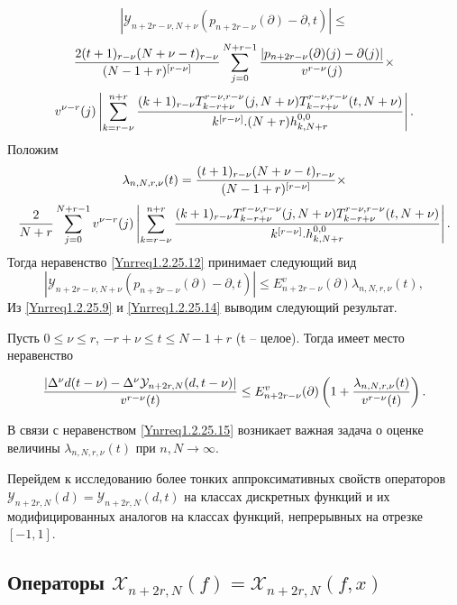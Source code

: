 $$
|\mathcal{Y}_{n+2r-\nu,N+\nu}(p_{n+2r-\nu}(\partial)-\partial,t)|\le
$$
$$
{2(t+1)_{r-\nu}(N+\nu-t)_{r-\nu}\over (N-1+r)^{[r-\nu]}}\sum_{j=0}^{N+r-1}{|p_{n+2r-\nu}(\partial)(j)-\partial(j)|\over v^{r-\nu}(j)}\times
$$
\begin{equation}\label{Ynrreq1.2.25.12}
v^{\nu-r}(j)\left|\sum_{k=r-\nu}^{n+r} {(k+1)_{r-\nu}T_{k-r+\nu}^{r-\nu,r-\nu}(j,N+\nu)T_{k-r+\nu}^{r-\nu,r-\nu}(t,N+\nu)\over k^{[r-\nu]}.
 (N+r)h_{k,N+r}^{0,0}}\right|.
\end{equation}
Положим
$$
\lambda_{n,N,r,\nu}(t)={(t+1)_{r-\nu}(N+\nu-t)_{r-\nu}\over (N-1+r)^{[r-\nu]}}\times
$$
\begin{equation}\label{Ynrreq1.2.25.13}
{2\over N+r}\sum_{j=0}^{N+r-1}v^{\nu-r}(j)
\left|\sum_{k=r-\nu}^{n+r} {(k+1)_{r-\nu}T_{k-r+\nu}^{r-\nu,r-\nu}(j,N+\nu)T_{k-r+\nu}^{r-\nu,r-\nu}(t,N+\nu)\over k^{[r-\nu]}.
 h_{k,N+r}^{0,0}}\right|.
\end{equation}
Тогда неравенство \eqref{Ynrreq1.2.25.12} принимает следующий  вид
\begin{equation}\label{Ynrreq1.2.25.14}
|\mathcal{Y}_{n+2r-\nu,N+\nu}(p_{n+2r-\nu}(\partial)-\partial,t)|\le E_{n+2r-\nu}^v(\partial)\lambda_{n,N,r,\nu}(t),
\end{equation}
Из \eqref{Ynrreq1.2.25.9} и \eqref{Ynrreq1.2.25.14} выводим следующий результат.

\begin{theorem}\label{Yn2r:t2}
Пусть $0\le\nu\le r$, $-r+\nu\le t\le N-1+r$ (t -- целое). Тогда имеет место неравенство

\begin{equation}\label{Ynrreq1.2.25.15}
{|\Delta^\nu d(t-\nu) -\Delta^\nu\mathcal{Y}_{n+2r,N}(d,t-\nu)|\over v^{r-\nu}(t)} \le E_{n+2r-\nu}^v(\partial)\left(1+{\lambda_{n,N,r,\nu}(t)\over v^{r-\nu}(t)}\right).
\end{equation}
\end{theorem}
В связи с неравенством  \eqref{Ynrreq1.2.25.15} возникает важная задача о оценке величины $\lambda_{n,N,r,\nu}(t)$  при $n,N\to\infty$.


Перейдем к исследованию более тонких аппроксимативных свойств операторов   $\mathcal{Y}_{n+2r,N}(d)=\mathcal{Y}_{n+2r,N}(d,t)$ на классах дискретных функций и их модифицированных аналогов на классах функций, непрерывных на отрезке $[-1,1]$.



\subsection{Операторы $\mathcal{X}_{n+2r,N}(f)=\mathcal{X}_{n+2r,N}(f,x)$}

